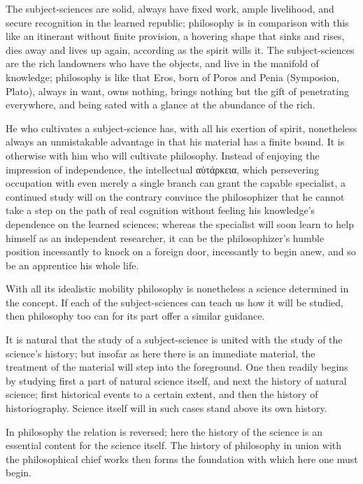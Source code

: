 \documentclass[12pt]{book}
\begin{document}
The subject-sciences are solid, always have fixed work, ample livelihood, and secure
recognition in the learned republic; philosophy is in comparison with this like an itinerant
without finite provision, a hovering shape that sinks and rises, dies away and lives up again,
according as the spirit wills it. The subject-sciences are the rich landowners who have the
objects, and live in the manifold of knowledge; philosophy is like that Eros, born of Poros
and Penia (Symposion, Plato), always in want, owns nothing, brings nothing but the
gift of penetrating everywhere, and being sated with a glance at the abundance of the rich.

He who cultivates a subject-science has, with all his exertion of spirit, nonetheless always
an unmistakable advantage in that his material has a finite bound. It is otherwise with him
who will cultivate philosophy. Instead of enjoying the impression of independence, the
intellectual αὐτάρκεια, which persevering occupation with even merely a single branch can
grant the capable specialist, a continued study will on the contrary convince the philosophizer
that he cannot take a step on the path of real cognition without feeling his knowledge's
dependence on the learned sciences; whereas the specialist will soon learn to help himself as
an independent researcher, it can be the philosophizer's humble position incessantly to knock
on a foreign door, incessantly to begin anew, and so be an apprentice his whole life.

With all its idealistic mobility philosophy is nonetheless a science determined in the concept.
If each of the subject-sciences can teach us how it will be studied, then philosophy too can for
its part offer a similar guidance.

It is natural that the study of a subject-science is united with the study of the science's
history; but insofar as here there is an immediate material, the treatment of the material will
step into the foreground. One then readily begins by studying first a part of natural science
itself, and next the history of natural science; first historical events to a certain extent,
and then the history of historiography. Science itself will in such cases stand above its own
history.

In philosophy the relation is reversed; here the history of the science is an essential content
for the science itself. The history of philosophy in union with the philosophical chief works
then forms the foundation with which here one must begin.
\end{document}
